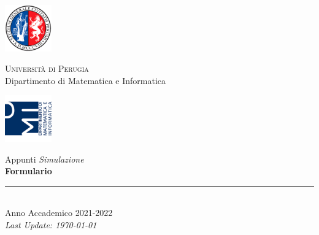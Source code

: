 
\thispagestyle{empty} %

\noindent %
\includegraphics[width=0.15\textwidth]{frontmatter/imgs/logoUniPg.jpg}
\begin{minipage}[b]{0.7\textwidth}
    \centering
    {\Large \textsc{Universit{\`a} di Perugia}}\\
    \vspace{0.4 em}
    {\large Dipartimento di Matematica e Informatica}
    \vspace{0.6 em}
\end{minipage}%
\includegraphics[width=0.15\textwidth]{frontmatter/imgs/logoDMI.jpg}

\vspace{8 em}

\begin{center}
    {\Huge Appunti \textit{Simulazione}}\\
    \vspace{5 em}
    {\Huge \textbf{Formulario}}\\

    \vfill

    \rule{380pt}{.4pt}\\
    \vspace{1.2 em}
    \large{Anno Accademico 2021-2022}\\ %
    \vspace{.9 em}
    \small{\textit{Last Update: \today{}}}
\end{center}

